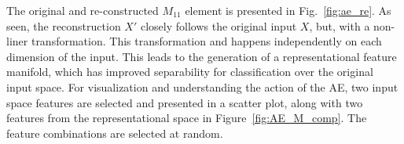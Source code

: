
The original and re-constructed $M_{11}$ element is presented in Fig.~\ref{fig:ae_re}. As seen, the reconstruction $X'$ closely follows the original input $X$, but, with a non-liner transformation. This transformation and happens independently on each dimension of the input. This leads to the generation of a representational feature manifold, which has improved separability for classification over the original input space.
%
For visualization and understanding the action of the AE, two input space features are selected and presented in a scatter plot, along with two features from the representational space in Figure~\ref{fig:AE_M_comp}. The feature combinations are selected at random.


